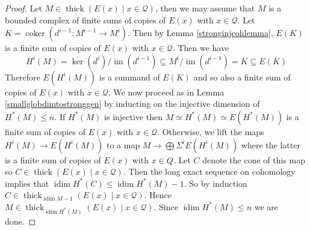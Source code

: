\documentclass[12pt,oneside]{amsart}
\DeclareMathOperator*{\coker}{coker}
\DeclareMathOperator{\im}{im}
\DeclareMathOperator{\thick}{thick}
\DeclareMathOperator{\idim}{idim}
\begin{document}
\begin{proof} 
Let $M \in \thick(E(x) \mid x \in \mathcal{Q})$, then we may assume that $M$ is a bounded complex of finite sums of copies of $E(x)$ with $x \in \mathcal{Q}$. Let $K = \coker(d^{i-1}: M^{i-1} \to M^{i})$. Then by Lemma \ref{stronginjcohlemma}, $E(K)$ is a finite sum of copies of $E(x)$ with $x \in \mathcal{Q}$. Then we have
\[
H^i(M) = \ker(d^i)/\im(d^{i-1}) \subseteq M^i/\im(d^{i-1}) =K \subseteq E(K)
\]
Therefore $E(H^i(M))$ is a summand of $E(K)$ and so also a finite sum of copies of $E(x)$ with $x \in \mathcal{Q}$. We now proceed as in Lemma \ref{smallglobdimtostronggen} by inducting on the injective dimension of $H^\ast(M) \leq n$. If $H^\ast(M)$ is injective then $M \simeq H^\ast(M) \simeq E(H^\ast(M))$ is a finite sum of copies of $E(x)$ with $x \in \mathcal{Q}$. Otherwise, we lift the maps $H^i(M) \to E(H^i(M))$ to a map $M \to \bigoplus \Sigma^{i} E(H^i(M))$ where the latter is a finite sum of copies of $E(x)$ with $x \in Q$. Let $C$ denote the cone of this map so $C \in \thick(E(x) \mid x \in \mathcal{Q})$. Then the long exact sequence on cohomology implies that $\idim H^\ast(C) \leq \idim H^\ast(M) - 1$. So by induction $C \in \thick_{ \idim M -1}(E(x) \mid x \in \mathcal{Q})$. Hence $M \in \thick_{\idim H^\ast(M)}(E(x) \mid x \in \mathcal{Q})$. Since $\idim H^\ast(M) \leq n$ we are done. 
\end{proof}
\end{document}
